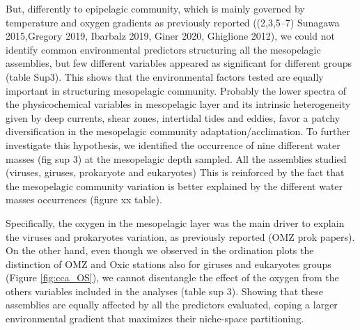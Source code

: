 \documentclass[fleqn,10pt]{wlscirep}
\begin{document}
But, differently to epipelagic community, which is mainly governed by temperature and oxygen gradients as previously reported ((2,3,5–7) Sunagawa 2015,Gregory 2019, Ibarbalz 2019, Giner 2020, Ghiglione 2012), we could not identify common environmental predictors structuring all the mesopelagic assemblies, but few different variables appeared as significant for different groups (table Sup3). This shows that the environmental factors tested are equally important in structuring mesopelagic community. Probably the lower spectra of the physicochemical variables in mesopelagic layer and its intrinsic heterogeneity given by deep currents, shear zones, intertidal tides and eddies, favor a patchy diversification in the mesopelagic community adaptation/acclimation. To further investigate this hypothesis, we identified the occurrence of nine different water masses (fig sup 3) at the mesopelagic depth sampled. All the assemblies studied (viruses, giruses, prokaryote and eukaryotes) This is reinforced by the fact that the mesopelagic community variation is better explained by the different water masses occurrences (figure xx table).

Specifically, the oxygen in the mesopelagic layer was the main driver to explain the viruses and prokaryotes variation, as previously reported (OMZ prok papers). On the other hand, even though we observed in the ordination plots  the distinction of OMZ and Oxic stations also for giruses and eukaryotes groups (Figure \ref{fig:cca_OS}), we cannot disentangle the effect of the oxygen from the others variables included in the analyses (table sup 3). Showing that these assemblies are equally affected by all the predictors evaluated, coping a larger environmental gradient that maximizes their niche-space partitioning.
\end{document}
